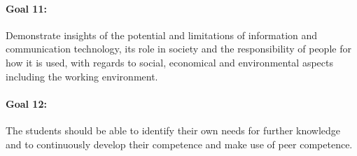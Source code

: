 %
%

\paragraph{Goal 11:} Demonstrate insights of the potential and
limitations of information and communication technology, its role in
society and the responsibility of people for how it is used, with
regards to social, economical and environmental aspects including the
working environment.

%
%
%
\paragraph{Goal 12:} The students should be able to identify their own
needs for further knowledge and to continuously develop their
competence and make use of peer competence.

%
%
%


